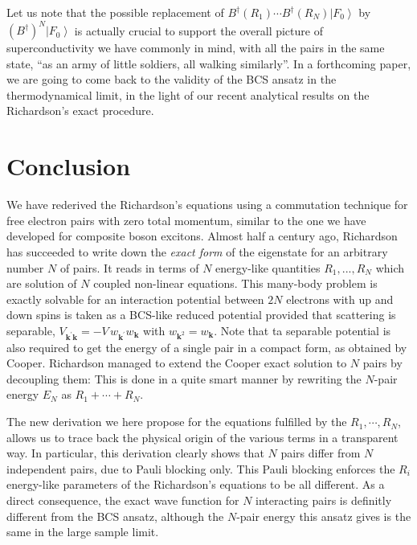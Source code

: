 \documentclass[aps,prb,superscriptaddress,twocolumn]{revtex4}
\newcommand{\vk}{\ensuremath{\mathbf{k}}}
\begin{document}
Let us note that the possible replacement of $B^{\dagger}(R_1)\cdots{}B^{\dagger}(R_N)%
\left|F_0\right>  $ by $\left(B^{\dagger}\right) ^N\left|F_0\right>  $ is
actually crucial to support the overall picture of
superconductivity we have commonly in mind, with all the pairs in the same state, ``as an army of
little soldiers, all walking similarly''. 
In a forthcoming paper, we are going to come back to the validity of the BCS 
ansatz in the thermodynamical limit, in the light of our recent analytical results on the Richardson's exact procedure.

\section{Conclusion}

We have rederived the Richardson's equations using a commutation technique for
free electron pairs with zero total momentum, similar to the one we have
developed for composite boson excitons. Almost half a century ago,
Richardson has succeeded to write down the \emph{exact form} of the eigenstate for an
arbitrary number $N$ of pairs. It reads in terms of $N$ energy-like
quantities $R_1,..., R_N$ which are solution of $N$ coupled non-linear
equations. This many-body problem is exactly solvable for an
interaction potential between $2N$ electrons with up and down spins is taken 
as a BCS-like reduced potential provided that 
scattering is separable, $V_{\mathbf{k} ^{\prime}\mathbf{k} }=-V\,w_{\mathbf{k}
^{\prime}}w_{\mathbf{k} }$ with $w_{\mathbf{k}^2}=w_{\mathbf{k}}$.
Note that ta separable potential is also required to get
the energy of a single pair in a compact form, as obtained by Cooper.
Richardson managed to extend the Cooper exact solution to $N$ pairs by
decoupling them: This is done in a quite smart manner by rewriting the $N$-pair energy $E_N$ as $R_1+\cdots+R_N$.

The new derivation we here propose for the equations fulfilled by the $R_1,\cdots,R_N$, allows us to trace back
the physical origin of the various terms in a transparent way. In
particular, this derivation clearly shows that $N$ pairs differ from $N$ independent
pairs, due to Pauli blocking only. This Pauli blocking
enforces the $R_i$ energy-like parameters of the Richardson's equations to be all different. 
As a direct consequence, the exact wave function for $N$ interacting pairs is 
definitly different from the BCS ansatz, although the $N$-pair energy this ansatz gives is the same in the large sample limit. 
\end{document}
